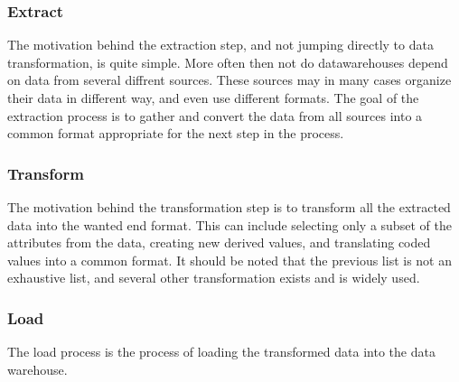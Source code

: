 		\subsubsection{Extract}
			The motivation behind the extraction step, and not jumping directly to data transformation, is quite simple. More often then not do datawarehouses depend on data from several diffrent sources. These sources may in many cases organize their data in different way, and even use different formats. 
			The goal of the extraction process is to gather and convert the data from all sources into a common format appropriate for the next step in the process.
			
		\subsubsection{Transform}
			The motivation behind the transformation step is to transform all the extracted data into the wanted end format. This can include selecting only a subset of the attributes from the data, creating new derived values, and translating coded values into a common format. It should be noted that the previous list is not an exhaustive list, and several other transformation exists and is widely used.
			
		\subsubsection{Load}
			The load process is the process of loading the transformed data into the data warehouse. 